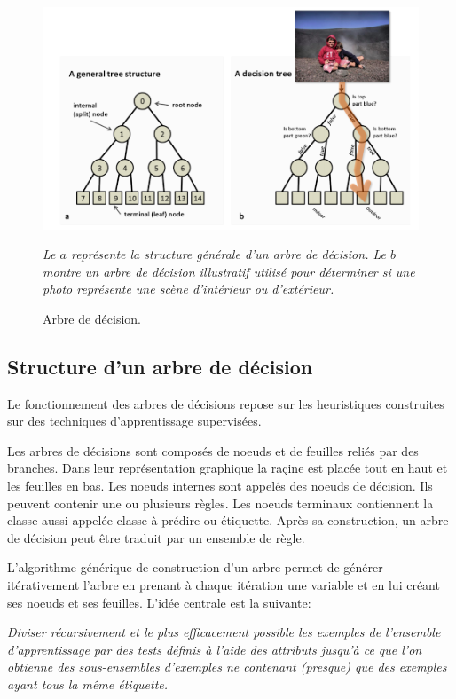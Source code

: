 \begin{figure}[h!]
  \begin{center}
    \includegraphics[width=14cm]{images/decisionTree.png}
    \caption{Arbre de décision. 
	\label{fig:DecisionTree}}
  \end{center}
  \textit{Le $a$ représente la structure générale d'un arbre de décision. Le
$b$ montre un arbre de décision illustratif utilisé pour déterminer 
si une photo représente une scène d'intérieur ou d'extérieur.}
\end{figure}

\subsection{Structure d'un arbre de décision}

Le fonctionnement des arbres de décisions repose sur les heuristiques 
construites sur des techniques d'apprentissage supervisées.

Les arbres de décisions sont composés de noeuds et de feuilles reliés par des
branches. Dans leur représentation graphique la raçine est placée tout en haut
et les feuilles en bas. Les noeuds internes sont appelés des noeuds de décision.
Ils peuvent contenir une ou plusieurs règles. Les noeuds terminaux contiennent
la classe aussi appelée classe à prédire ou étiquette. Après sa construction, un
arbre de décision peut être traduit par un ensemble de règle.

L'algorithme  générique  de construction d'un arbre permet de générer
itérativement l'arbre en prenant à chaque itération une variable et en lui
créant ses noeuds et ses feuilles. L'idée centrale est la suivante:

\textit{Diviser récursivement et le plus efficacement possible les exemples de  
l'ensemble d'apprentissage par des tests définis à l'aide des attributs
jusqu'à ce que l'on obtienne des sous-ensembles d'exemples ne contenant 
(presque) que des exemples ayant tous la même étiquette.}

